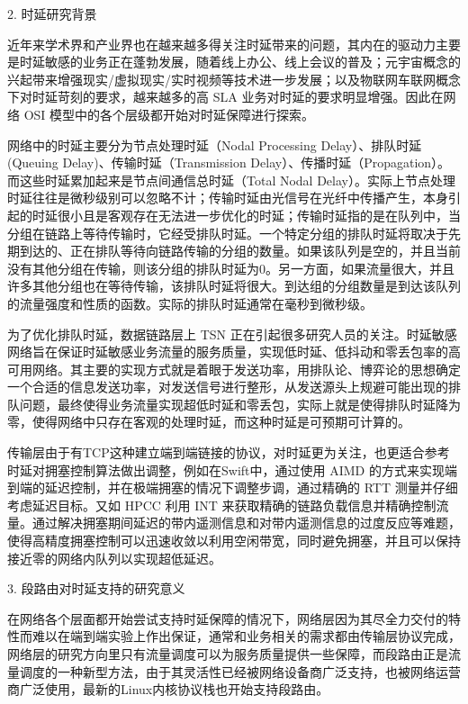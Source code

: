 2. 时延研究背景

近年来学术界和产业界也在越来越多得关注时延带来的问题，其内在的驱动力主要是时延敏感的业务正在蓬勃发展，随着线上办公、线上会议的普及；元宇宙概念的兴起带来增强现实/虚拟现实/实时视频等技术进一步发展；以及物联网车联网概念下对时延苛刻的要求，越来越多的高 \gls*{SLA} 业务对时延的要求明显增强。因此在网络 \gls*{OSI} 模型中的各个层级都开始对时延保障进行探索。

网络中的时延主要分为节点处理时延（Nodal Processing Delay）、排队时延(Queuing Delay)、传输时延（Transmission Delay）、传播时延（Propagation）。而这些时延累加起来是节点间通信总时延（Total Nodal Delay）。实际上节点处理时延往往是微秒级别可以忽略不计；传输时延由光信号在光纤中传播产生，本身引起的时延很小且是客观存在无法进一步优化的时延；传输时延指的是在队列中，当分组在链路上等待传输时，它经受排队时延。一个特定分组的排队时延将取决于先期到达的、正在排队等待向链路传输的分组的数量。如果该队列是空的，并且当前没有其他分组在传输，则该分组的排队时延为0。另一方面，如果流量很大，并且许多其他分组也在等待传输，该排队时延将很大。到达组的分组数量是到达该队列的流量强度和性质的函数。实际的排队时延通常在毫秒到微秒级。

为了优化排队时延，数据链路层上 \gls*{TSN} 正在引起很多研究人员的关注。时延敏感网络旨在保证时延敏感业务流量的服务质量，实现低时延、低抖动和零丢包率的高可用网络。其主要的实现方式就是着眼于发送功率，用排队论、博弈论的思想确定一个合适的信息发送功率，对发送信号进行整形，从发送源头上规避可能出现的排队问题，最终使得业务流量实现超低时延和零丢包，实际上就是使得排队时延降为零，使得网络中只存在客观的处理时延，而这种时延是可预期可计算的。

传输层由于有TCP这种建立端到端链接的协议，对时延更为关注，也更适合参考时延对拥塞控制算法做出调整，例如在Swift中，通过使用 \gls*{AIMD} 的方式来实现端到端的延迟控制，并在极端拥塞的情况下调整步调，通过精确的 \gls*{RTT} 测量并仔细考虑延迟目标。又如 \gls*{HPCC} 利用 \gls*{INT} 来获取精确的链路负载信息并精确控制流量。通过解决拥塞期间延迟的带内遥测信息和对带内遥测信息的过度反应等难题，使得高精度拥塞控制可以迅速收敛以利用空闲带宽，同时避免拥塞，并且可以保持接近零的网络内队列以实现超低延迟。

3. 段路由对时延支持的研究意义

在网络各个层面都开始尝试支持时延保障的情况下，网络层因为其尽全力交付的特性而难以在端到端实验上作出保证，通常和业务相关的需求都由传输层协议完成，网络层的研究方向里只有流量调度可以为服务质量提供一些保障，而段路由正是流量调度的一种新型方法，由于其灵活性已经被网络设备商广泛支持，也被网络运营商广泛使用，最新的Linux内核协议栈也开始支持段路由。

